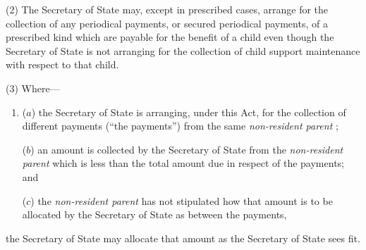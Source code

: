 \documentclass[12pt,a4paper]{article}
\begin{document}

(2) The 
Secretary of State  %
may, except in prescribed cases, arrange for the collection of any periodical payments, or secured periodical payments, of a prescribed kind which are payable for the benefit of a child even though 
the Secretary of State  %
is not arranging for the collection of child support maintenance with respect to that child.

(3) Where—
\begin{enumerate}\item[]
($a$) the 
Secretary of State  %
is arranging, under this Act, for the collection of different payments (“the payments”) from the same 
\emph{non-resident parent}%
;

($b$) an amount is collected by the 
Secretary of State  %
from the 
\emph{non-resident parent}  %
which is less than the total amount due in respect of the payments; and

($c$) the 
\emph{non-resident parent}  %
has not stipulated how that amount is to be allocated by the 
Secretary of State  %
as between the payments,
\end{enumerate}
the 
Secretary of State  %
may allocate that amount as 
the Secretary of State  %
sees fit.
\end{document}
